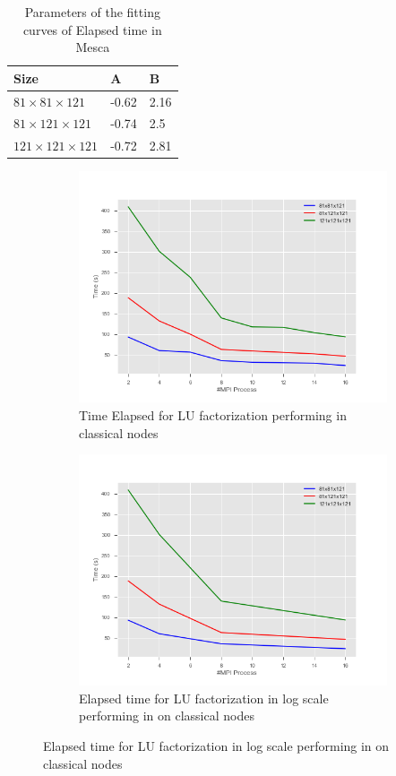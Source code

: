 \begin{table}[!h]
\centering
\begin{tabular}{l|l|l}
Size & A & B  \\
 \hline
 $81 \times 81 \times 121$ & -0.62 & 2.16	\\
$81 \times 121 \times 121$ & -0.74 & 2.5 \\
$121 \times 121 \times 121$ &  -0.72 & 2.81

\end{tabular}
\caption{Parameters of the fitting curves of Elapsed time in Mesca}
\label{fittingMesca}
\end{table}



\begin{figure}
\centering 
  \begin{subfigure}[b]{0.7\textwidth}
    \includegraphics[width=\textwidth]{images/TimeLU.png}
    \caption{Time Elapsed for LU factorization performing in classical nodes}
    \label{TimeLU}
  \end{subfigure}
   
   \begin{subfigure}[b]{0.7\textwidth}
    \includegraphics[width=\textwidth]{images/TimeLU2.png}
    \caption{Elapsed time for LU factorization in log scale performing in on classical nodes}
    \label{TimeLU2}
  \end{subfigure}
  

\end{figure}
